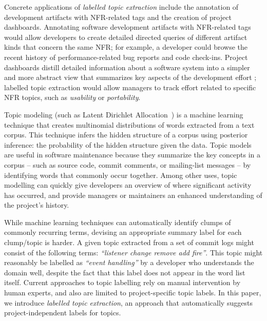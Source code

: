 \documentclass[smallextended]{svjour3}       %
\begin{document}
Concrete applications of \emph{labelled topic extraction} include the annotation of development artifacts with NFR-related tags and the creation of project dashboards.  Annotating software development artifacts with NFR-related tags would allow developers to create detailed directed queries of different artifact kinds that concern the same NFR; for example, a developer could browse the recent history of performance-related bug reports and code check-ins. Project dashboards distill detailed information about a software system into a simpler and more abstract view that summarizes key aspects of the development effort \cite{dashboard}; labelled topic extraction would allow managers to track effort related to specific NFR topics, such as \emph{usability} or \emph{portability}.


Topic modeling (such as Latent Dirichlet Allocation~\cite{Blei2003}) is a machine learning technique that creates
multinomial distributions of words extracted from a text corpus. 
This technique infers the hidden structure of a corpus using posterior
inference: the probability of the hidden structure given the data. 
Topic models are useful in software maintenance because they summarize
the key concepts in a corpus -- such as source code, commit comments, or
mailing-list messages -- by identifying words that commonly occur together. 
Among other uses, topic modelling can quickly give developers an overview of where significant
activity has occurred, and provide managers or maintainers an enhanced understanding of the project's 
history.

While machine learning techniques can automatically identify clumps of
commonly recurring terms, devising an appropriate summary label for
each clump/topic is harder.  
A given topic extracted from a set of commit logs might consist of the following terms: \emph{ ``listener change remove add fire''}. 
This topic might reasonably be labelled as
\emph{``event handling''} by a developer who understands the domain well,
despite the fact that this label does not appear in the word list itself.  
Current approaches to topic labelling rely on manual intervention by
human experts, and also are limited to project-specific topic labels.  
In this paper, we introduce \emph{labelled topic extraction}, an
approach that automatically suggests project-independent labels for topics.
\end{document}
